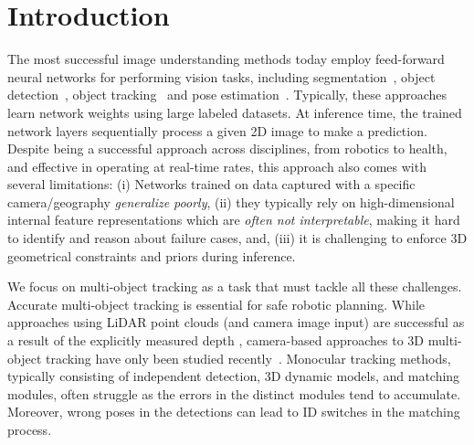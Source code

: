 \section{Introduction}
The most successful image understanding methods today employ feed-forward neural networks for performing vision tasks, including segmentation~\cite{long2015fully,li2017fully, chen2014semantic}, object detection~\cite{ren2015faster, girshick2015fast, redmon2016yolo, liu2016ssd, ku2018joint, qi2018frustum, zhou2018voxelnet}, object tracking~\cite{sharma2018beyond, kim2021eagermot, zhou2020CenterTrack, chaabane2021deft, yin2021center, weng2020AB3DMOT,pang2021simpletrack} and pose estimation~\cite{wang2019densefusion, xiang2017posecnn}. Typically, these approaches learn network weights using large labeled datasets. At inference time, the trained network layers sequentially process a given 2D image to make a prediction. Despite being a successful approach across disciplines, from robotics to health, and effective in operating at real-time rates, this approach also comes with several limitations: (i) Networks trained on data captured with a specific camera/geography 
\emph{generalize poorly}, (ii) they typically rely on high-dimensional internal feature representations which are \emph{often not interpretable}, making it hard to identify and reason about failure cases, and, (iii) it is challenging to enforce 3D geometrical constraints and priors during inference.

We focus on multi-object tracking as a task that must tackle all these challenges. Accurate multi-object tracking is essential for safe robotic planning. While approaches using LiDAR point clouds (and camera image input) are successful as a result of the explicitly measured depth \cite{pang2021simpletrack,yin2021center,kim2021eagermot,liu2022bevfusion, weng2020gnn3dmot, focalformer3d, bai2021pointdsc}, camera-based approaches to 3D multi-object tracking have only been studied recently~\cite{hu2021QD3DT, wu2021trades, zhou2020CenterTrack, marinello2022triplettrack, chaabane2021deft, nguyen2022multiCamMultiTrack, gladkova2022directtracker, yang2022qtrack,pang2023PFtrack, wang2023StreamPETR}. Monocular tracking methods, typically consisting of independent detection, 3D dynamic models, and matching modules, often struggle as the errors in the distinct modules tend to accumulate. Moreover, wrong poses in the detections can lead to ID switches in the matching process.

